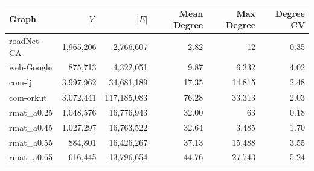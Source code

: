 \begin{tabular}{lrrrrr}
\hline
Graph & $|V|$ & $|E|$ & Mean Degree & Max Degree & Degree CV \\
\hline
roadNet-CA & 1,965,206 & 2,766,607 & 2.82 & 12 & 0.35 \\
web-Google & 875,713 & 4,322,051 & 9.87 & 6,332 & 4.02 \\
com-lj & 3,997,962 & 34,681,189 & 17.35 & 14,815 & 2.48 \\
com-orkut & 3,072,441 & 117,185,083 & 76.28 & 33,313 & 2.03 \\
rmat_a0.25 & 1,048,576 & 16,776,943 & 32.00 & 63 & 0.18 \\
rmat_a0.45 & 1,027,297 & 16,763,522 & 32.64 & 3,485 & 1.70 \\
rmat_a0.55 & 884,801 & 16,426,267 & 37.13 & 15,488 & 3.55 \\
rmat_a0.65 & 616,445 & 13,796,654 & 44.76 & 27,743 & 5.24 \\
\hline
\end{tabular}
